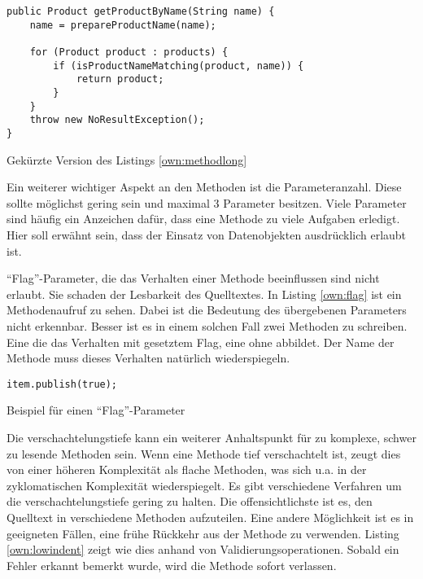 \begin{listing}[H]
    \begin{verbatim}
public Product getProductByName(String name) {
    name = prepareProductName(name);

    for (Product product : products) {
        if (isProductNameMatching(product, name)) {
            return product;
        }
    }
    throw new NoResultException();
}
    \end{verbatim}
    \caption{Gekürzte Version des Listings \ref{own:methodlong}}
    \label{own:methodshort}
\end{listing}

Ein weiterer wichtiger Aspekt an den Methoden ist die Parameteranzahl. Diese sollte möglichst gering sein und maximal 3 Parameter besitzen. Viele Parameter sind häufig ein Anzeichen dafür, dass eine Methode zu viele Aufgaben erledigt. Hier soll erwähnt sein, dass der Einsatz von Datenobjekten ausdrücklich erlaubt ist.

\enquote{Flag}-Parameter, die das Verhalten einer Methode beeinflussen sind nicht erlaubt. Sie schaden der Lesbarkeit des Quelltextes. In Listing \ref{own:flag} ist ein Methodenaufruf zu sehen. Dabei ist die Bedeutung des übergebenen Parameters nicht erkennbar. Besser ist es in einem solchen Fall zwei Methoden zu schreiben. Eine die das Verhalten mit gesetztem Flag, eine ohne abbildet. Der Name der Methode muss dieses Verhalten natürlich wiederspiegeln.

\begin{listing}[H]
    \begin{verbatim}
item.publish(true);
    \end{verbatim}
    \caption{Beispiel für einen \enquote{Flag}-Parameter}
    \label{own:flag}
\end{listing}

Die verschachtelungstiefe kann ein weiterer Anhaltspunkt für zu komplexe, schwer zu lesende Methoden sein. Wenn eine Methode tief verschachtelt ist, zeugt dies von einer höheren Komplexität als flache Methoden, was sich u.a. in der zyklomatischen Komplexität wiederspiegelt\cite{McCabe}. Es gibt verschiedene Verfahren um die verschachtelungstiefe gering zu halten. Die offensichtlichste ist es, den Quelltext in verschiedene Methoden aufzuteilen. Eine andere Möglichkeit ist es in geeigneten Fällen, eine frühe Rückkehr aus der Methode zu verwenden. Listing \ref{own:lowindent} zeigt wie dies anhand von Validierungsoperationen. Sobald ein Fehler erkannt bemerkt wurde, wird die Methode sofort verlassen.

